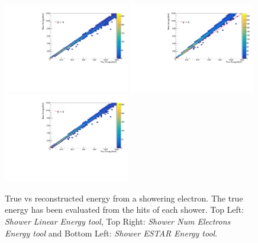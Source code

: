 \begin{figure}[h!]
    \centering
    \includegraphics[width = 0.49\textwidth]{figures-chap4/true_vs_reco_linear.pdf}
    \includegraphics[width = 0.49\textwidth]{figures-chap4/true_vs_reco_oldmethod.pdf}
    \includegraphics[width = 0.49\textwidth]{figures-chap4/true_vs_reco_ESTAR.pdf}
    \captionsetup{width=0.45\textwidth}
    \parbox[b]{0.49\textwidth}%
  {
    \caption[True vs reconstructed energy from a showering electron. The true energy has been evaluated from the hits of each shower.]
    {True vs reconstructed energy from a showering electron. The true energy has been evaluated from the hits of each shower. Top Left: \textit{Shower Linear Energy tool}, Top Right: \textit{Shower Num Electrons Energy tool} and Bottom Left: \textit{Shower ESTAR Energy tool}. \\\\}
    \label{fig:reco_vs_true_hit_level}}
\end{figure}


